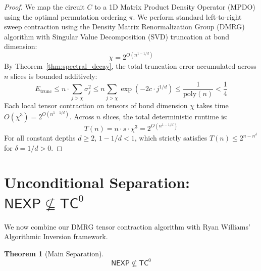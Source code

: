 \documentclass[11pt,letterpaper]{article}
\newtheorem{theorem}{Theorem}[section]
\newcommand{\NEXP}{\mathsf{NEXP}}
\newcommand{\TC}{\mathsf{TC}}
\newcommand{\poly}{\mathrm{poly}}
\begin{document}
\begin{proof}
We map the circuit $C$ to a 1D Matrix Product Density Operator (MPDO) using the optimal permutation ordering $\pi$. We perform standard left-to-right sweep contraction using the Density Matrix Renormalization Group (DMRG) algorithm with Singular Value Decomposition (SVD) truncation at bond dimension:
\[
\chi = 2^{O(n^{1 - 1/d})}
\]
By Theorem~\ref{thm:spectral_decay}, the total truncation error accumulated across $n$ slices is bounded additively:
\[
E_{\text{trunc}} \le n \cdot \sum_{j > \chi} \sigma_j^2 \le n \sum_{j > \chi} \exp\left(-2c \cdot j^{1/d}\right) \le \frac{1}{\poly(n)} < \frac{1}{4}
\]
Each local tensor contraction on tensors of bond dimension $\chi$ takes time $O(\chi^3) = 2^{O(n^{1 - 1/d})}$. Across $n$ slices, the total deterministic runtime is:
\[
T(n) = n \cdot s \cdot \chi^3 = 2^{O(n^{1 - 1/d})}
\]
For all constant depths $d \ge 2$, $1 - 1/d < 1$, which strictly satisfies $T(n) \le 2^{n - n^\delta}$ for $\delta = 1/d > 0$.
\end{proof}

\section{Unconditional Separation: $\NEXP \not\subseteq \TC^0$}

We now combine our DMRG tensor contraction algorithm with Ryan Williams' Algorithmic Inversion framework.

\begin{theorem}[Main Separation]
\label{thm:main_separation}
\[
\NEXP \not\subseteq \TC^0
\]
\end{theorem}
\end{document}

